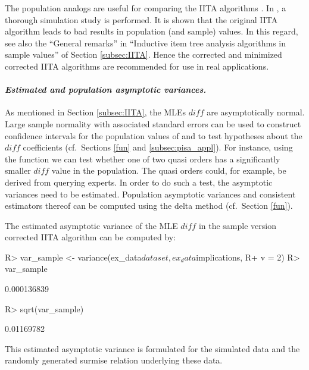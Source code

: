 \documentclass[nojss]{jss}
\begin{document}
The population
analogs are useful for comparing the IITA algorithms \citep{US:10}. In \cite{US:10}, a thorough
simulation study is performed. It is shown that the original IITA algorithm leads to bad results 
in population (and sample) values. In this regard, see also the ``General remarks'' in 
``Inductive item tree analysis algorithms in sample values'' of Section \ref{subsec:IITA}.
Hence the corrected and minimized corrected IITA algorithms are recommended for use 
in real applications. 

\paragraph{\it Estimated and population asymptotic variances.}
As mentioned in Section \ref{subsec:IITA}, the MLEs $\mathit{diff}$ are asymptotically normal. 
Large sample normality with associated standard errors can be used to construct confidence 
intervals for the population values 
of and to test hypotheses about the $\mathit{diff}$ coefficients (cf.\ Sections \ref{fun} and 
\ref{subsec:pisa_appl}).
For instance, using the function  we can test whether one of two quasi orders 
has a significantly smaller $\mathit{diff}$ value in the population. The quasi orders could, for example, be derived from querying experts. In order to do such a test, 
the asymptotic variances need to be estimated. Population asymptotic variances and consistent estimators thereof can be computed 
using the delta method (cf.\ Section \ref{fun}).

The estimated asymptotic variance of the MLE $\mathit{diff}$ in the sample version 
corrected IITA algorithm can be computed by:
\begin{Schunk}
\begin{Sinput}
R> var_sample <- variance(ex_data$dataset, ex_data$implications, 
R+    v = 2)
R> var_sample
\end{Sinput}
\begin{Soutput}
[1] 0.000136839
\end{Soutput}
\begin{Sinput}
R> sqrt(var_sample)
\end{Sinput}
\begin{Soutput}
[1] 0.01169782
\end{Soutput}
\end{Schunk}
This estimated asymptotic variance is formulated for the simulated data 
and the randomly generated surmise relation  
underlying these data.
\end{document}
